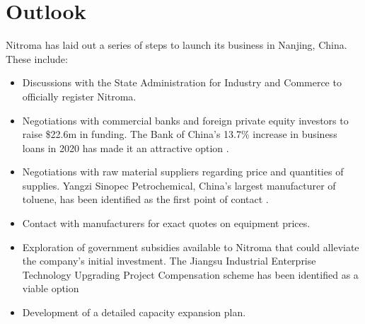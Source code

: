 \section{Outlook}
Nitroma has laid out a series of steps to launch its business in Nanjing, China. These include:
\begin{itemize}
    \item Discussions with the State Administration for Industry and Commerce to officially register Nitroma.
    \item Negotiations with commercial banks and foreign private equity investors to raise \$22.6m in funding. The Bank of China’s 13.7\% increase in business loans in 2020 has made it an attractive option \cite{kimathi_china_2020}.
    \item Negotiations with raw material suppliers regarding price and quantities of supplies. Yangzi Sinopec Petrochemical, China’s largest manufacturer of toluene, has been identified as the first point of contact \cite{sinopec_group_sinopec_2014}.
    \item Contact with manufacturers for exact quotes on equipment prices.
    \item Exploration of government subsidies available to Nitroma that could alleviate the company’s initial investment. The Jiangsu Industrial Enterprise Technology Upgrading Project Compensation scheme has been identified as a viable option \cite{chinainno}
    \item Development of a detailed capacity expansion plan.
\end{itemize}




